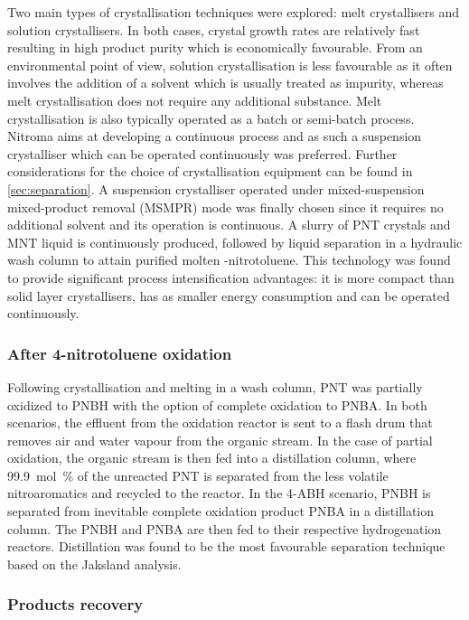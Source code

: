 Two main types of crystallisation techniques were explored: melt crystallisers and solution crystallisers. In both cases, crystal growth rates are relatively fast resulting in high product purity which is economically favourable. From an environmental point of view, solution crystallisation is less favourable as it often involves the addition of a solvent which is usually treated as impurity, whereas melt crystallisation does not require any additional substance. Melt crystallisation is also typically operated as a batch or semi-batch process. Nitroma aims at developing a continuous process and as such a suspension crystalliser which can be operated continuously was preferred. Further considerations for the choice of crystallisation equipment can be found in \cref{sec:separation}. A suspension crystalliser operated under mixed-suspension mixed-product removal (MSMPR) mode was finally chosen since it requires no additional solvent and its operation is continuous. A slurry of PNT crystals and MNT liquid is continuously produced, followed by liquid separation in a hydraulic wash column to attain purified molten \para-nitrotoluene. This technology was found to provide significant process intensification advantages: it is more compact than solid layer crystallisers, has as smaller energy consumption and can be operated continuously.

\subsubsection{After 4-nitrotoluene oxidation}

Following crystallisation and melting in a wash column, PNT was partially oxidized to PNBH with the option of complete oxidation to PNBA. In both scenarios, the effluent from the oxidation reactor is sent to a flash drum that removes air and water vapour from the organic stream. In the case of partial oxidation, the organic stream is then fed into a distillation column, where \SI{99.9}{mol\percent} of the unreacted PNT is separated from the less volatile nitroaromatics and recycled to the reactor. 
In the 4-ABH scenario, PNBH is separated from inevitable complete oxidation product PNBA in a distillation column. The PNBH and PNBA are then fed to their respective hydrogenation reactors. Distillation was found to be the most favourable separation technique based on the Jaksland analysis.


\subsubsection{Products recovery}

